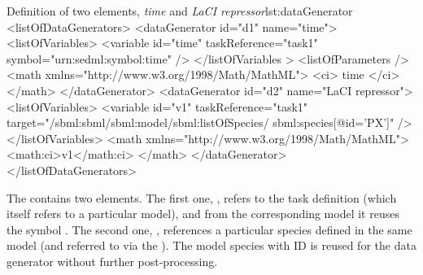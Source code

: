 
\begin{myXmlLst}{Definition of two  elements, \emph{time} and \emph{LaCI repressor}}{lst:dataGenerator}
<listOfDataGenerators>
 <dataGenerator id="d1" name="time">
  <listOfVariables>
   <variable id="time" taskReference="task1" symbol="urn:sedml:symbol:time" />
  </listOfVariables >
  <listOfParameters />
  <math xmlns="http://www.w3.org/1998/Math/MathML">
   <ci> time </ci>
  </math>
 </dataGenerator>
 <dataGenerator id="d2" name="LaCI repressor">
  <listOfVariables>
   <variable id="v1" taskReference="task1" 
    target="/sbml:sbml/sbml:model/sbml:listOfSpecies/
            sbml:species[@id='PX']" />
  </listOfVariables>
  <math xmlns="http://www.w3.org/1998/Math/MathML">
   <math:ci>v1</math:ci>
  </math>
 </dataGenerator>
</listOfDataGenerators>
\end{myXmlLst}

The  contains two  elements. 
The first one, , refers to the task definition  (which itself refers to a particular model), and from the corresponding model it reuses the symbol .
The second one, , references a particular species defined in the same model (and referred to via the ). The model species with ID  is reused for the data generator  without further post-processing.



